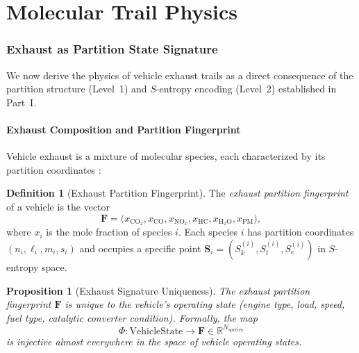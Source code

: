\documentclass[11pt,twocolumn,a4paper]{article}
\theoremstyle{plain}
\newtheorem{proposition}[theorem]{Proposition}
\theoremstyle{definition}
\newtheorem{definition}[theorem]{Definition}
\theoremstyle{remark}
\newcommand{\Sk}{S_k}
\newcommand{\St}{S_t}
\newcommand{\Se}{S_e}
\begin{document}
\part{Molecular Trail Physics}
\label{part:trail}

\section{Exhaust as Partition State Signature}
\label{sec:exhaust_signature}

We now derive the physics of vehicle exhaust trails as a direct consequence of the partition structure (Level~1) and $S$-entropy encoding (Level~2) established in Part~I.

\subsection{Exhaust Composition and Partition Fingerprint}

Vehicle exhaust is a mixture of molecular species, each characterized by its partition coordinates \cite{heywood2018internal}:

\begin{definition}[Exhaust Partition Fingerprint]
\label{def:fingerprint}
The \emph{exhaust partition fingerprint} of a vehicle is the vector
\begin{equation}
\mathbf{F} = \bigl(x_{\mathrm{CO}_2}, x_{\mathrm{CO}}, x_{\mathrm{NO}_x}, x_{\mathrm{HC}}, x_{\mathrm{H}_2\mathrm{O}}, x_{\mathrm{PM}}\bigr),
\label{eq:fingerprint}
\end{equation}
where $x_i$ is the mole fraction of species $i$. Each species $i$ has partition coordinates $(n_i, \ell_i, m_i, s_i)$ and occupies a specific point $\mathbf{S}_i = (\Sk^{(i)}, \St^{(i)}, \Se^{(i)})$ in $S$-entropy space.
\end{definition}

\begin{proposition}[Exhaust Signature Uniqueness]
\label{prop:uniqueness}
The exhaust partition fingerprint $\mathbf{F}$ is unique to the vehicle's operating state (engine type, load, speed, fuel type, catalytic converter condition). Formally, the map
\begin{equation}
\Phi: \text{VehicleState} \to \mathbf{F} \in \mathbb{R}^{N_{\mathrm{species}}}
\label{eq:phi}
\end{equation}
is injective almost everywhere in the space of vehicle operating states.
\end{proposition}
\end{document}
